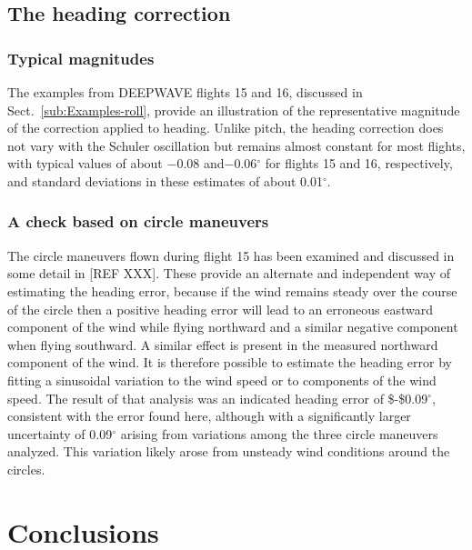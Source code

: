 \documentclass[english,british,amt,bookmarks=false,unicode=true]{copernicus}\usepackage[]{graphicx}\usepackage[]{color}
\begin{document}
\subsection{The heading correction}


\subsubsection{Typical magnitudes}

The examples from DEEPWAVE flights 15 and 16, discussed in Sect.~\ref{sub:Examples-roll},
provide an illustration of the representative magnitude of the correction
applied to heading. Unlike pitch, the heading correction does not
vary with the Schuler oscillation but remains almost constant for
most flights, with typical values of about $-0.08$ and$-0.06$$^{\circ}$
for flights 15 and 16, respectively, and standard deviations in these
estimates of about 0.01$^{\circ}$. 


\subsubsection{A check based on circle maneuvers}

The circle maneuvers flown during flight 15 has been examined and
discussed in some detail in {[}REF XXX{]}. These provide an alternate
and independent way of estimating the heading error, because if the
wind remains steady over the course of the circle then a positive
heading error will lead to an erroneous eastward component of the
wind while flying northward and a similar negative component when
flying southward. A similar effect is present in the measured northward
component of the wind. It is therefore possible to estimate the heading
error by fitting a sinusoidal variation to the wind speed or to components
of the wind speed. The result of that analysis was an indicated heading
error of \$-\$0.09$^{\circ}$, consistent with the error found here,
although with a significantly larger uncertainty of 0.09$^{\circ}$
arising from variations among the three circle maneuvers analyzed.
This variation likely arose from unsteady wind conditions around the
circles.


\section{Conclusions}


\end{document}
